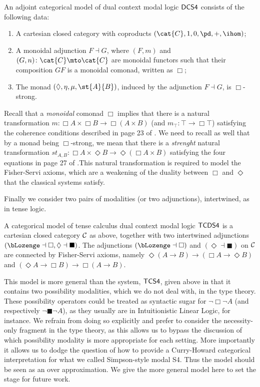 \begin{definition}
  \label{def:CS4-single-adjoint-cat-model}
  An adjoint categorical model of dual context modal logic $\sf{DCS4}$
  consists of the following data:
  \begin{enumerate}
  \item A cartesian closed category with coproducts
    $(\cat{C},1,0,\pd,+,\ihom)$;
  \item 
    A monoidal adjunction $F \dashv G$, where $(F,m)$ and $(G,n)\colon
    \cat{C} \mto \cat{C}$ are monoidal functors such that their
    composition $GF$ is a monoidal comonad, written as $\Box$;
 \item The  monad $(\Diamond, \eta, \mu, \st{A}{B})$, induced by the adjunction $F \dashv G$,   is $\Box$-strong.
  \end{enumerate}
\end{definition}
Recall that a {\textit{monoidal}} comonad $\Box$ implies that there is a natural transformation $m\colon \Box A\times \Box B\to \Box (A\times B)$ (and $m_{\top}\colon \top \to \Box \top$) satisfying the coherence conditions described in page 23 of \cite{bierman2000}. We need to recall as well that by a monad being $\Box$-strong, we mean that there is a \textit{strenght} natural transformation $st_{A,B}\colon \Box A\times \Diamond B\to \Diamond(\Box A\times B)$ satisfying the four equations in page 27 of \cite{bierman2000}.This natural transformation is required to model the Fisher-Servi axioms, which are a weakening of the duality between $\Box$ and $\Diamond$ that the classical systems satisfy.

Finally we consider two pairs of modalities (or two adjunctions),
intertwined, as in tense logic.

\begin{definition}
A categorical model of tense calculus dual context modal logic
$\sf{TCDS4}$ is a cartesian closed category $\cal{C}$ as above,
together with two intertwined adjunctions $(\bLozenge\dashv \Box,
\Diamond\dashv \blacksquare)$.  The adjunctions $(\bLozenge\dashv
\Box)$ and $(\Diamond\dashv \blacksquare)$ on $\cal{C}$ are connected
by Fisher-Servi axioms, namely $\Diamond (A\to B)\to (\Box A\to
\Diamond B)$ and $(\Diamond A\to \Box B)\to \Box (A\to B)$.
\end{definition}

This model is more general than the system, $\sf{TCS4}$, given above
in that it contains two possibility modalities, which we do not deal
with, in the type theory. These possibility operators could be treated
as syntactic sugar for $\neg \Box \neg A$ (and respectively $\neg
\blacksquare \neg A$), as they usually are in Intuitionistic Linear
Logic, for instance. We refrain from doing so explicitly and prefer to
consider the necessity-only fragment in the type theory, as this
allows us to bypass the discussion of which possibility modality is
more appropriate for each setting.  More importantly it allows us to
dodge the question of how to provide a Curry-Howard categorical
interpretation for what we called Simpson-style modal S4.  Thus the
model should be seen as an over approximation.  We give the more
general model here to set the stage for future work.

